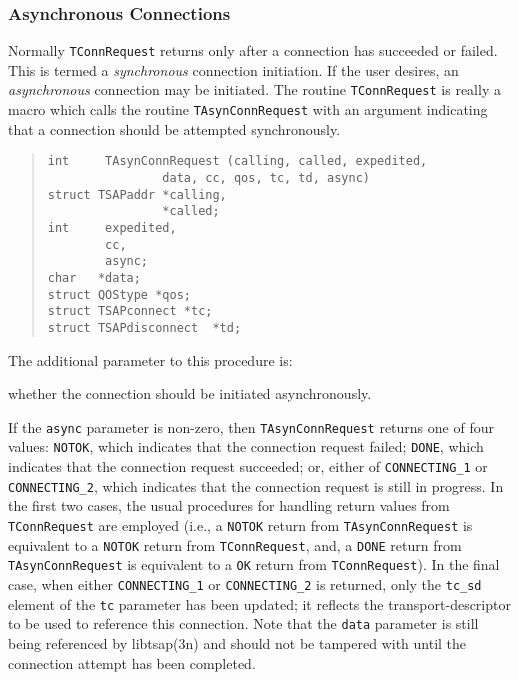 \subsubsection	{Asynchronous Connections}\label{tsap:async}
Normally \verb"TConnRequest" returns only after a connection has succeeded or
failed.
This is termed a {\em synchronous\/} connection initiation.
If the user desires, an {\em asynchronous\/} connection may be initiated.
The routine \verb"TConnRequest" is really a macro which calls the routine
\verb"TAsynConnRequest" with an argument indicating that a connection should
be attempted synchronously.
\begin{quote}\small\begin{verbatim}
int     TAsynConnRequest (calling, called, expedited,
                data, cc, qos, tc, td, async)
struct TSAPaddr *calling,
                *called;
int     expedited,
        cc,
        async;
char   *data;
struct QOStype *qos;
struct TSAPconnect *tc;
struct TSAPdisconnect  *td;
\end{verbatim}\end{quote}
The additional parameter to this procedure is:
\begin{describe}
\item[\verb"async":] whether the connection should be initiated asynchronously.
\end{describe}
If the \verb"async" parameter is non-zero,
then \verb"TAsynConnRequest" returns one of four values:
\verb"NOTOK", which indicates that the connection request failed;
\verb"DONE", which indicates that the connection request succeeded;
or, either of \verb"CONNECTING_1" or \verb"CONNECTING_2", which indicates that
the connection request is still in
progress.
In the first two cases,
the usual procedures for handling return values from \verb"TConnRequest" are
employed
(i.e., a \verb"NOTOK" return from \verb"TAsynConnRequest" is equivalent to a
\verb"NOTOK" return from \verb"TConnRequest", and,
a \verb"DONE" return from \verb"TAsynConnRequest" is equivalent to a
\verb"OK" return from \verb"TConnRequest").
In the final case, when either \verb"CONNECTING_1" or
\verb"CONNECTING_2" is returned,
only the \verb"tc_sd" element of the \verb"tc" parameter has been updated;
it reflects the transport-descriptor to be used to reference this connection.
Note that the \verb"data" parameter is still being referenced by
\man libtsap(3n) and should not be tampered with until the connection attempt
has been completed.

